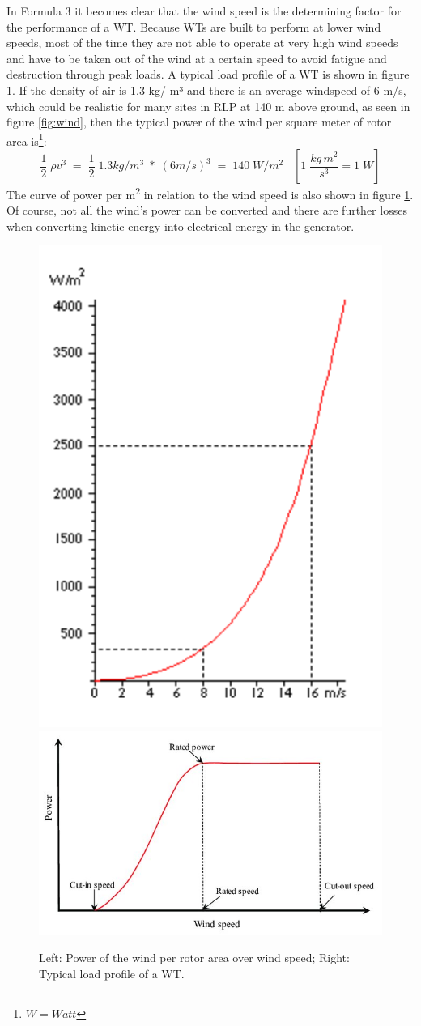 \documentclass[a4paper,11pt]{article}
\begin{document}
In Formula 3 it becomes clear that the wind speed is the determining factor for the performance of a WT. Because WTs are built to perform at lower wind speeds, most of the time they are not able to operate at very high wind speeds and have to be taken out of the wind at a certain speed to avoid fatigue and destruction through peak loads. A typical load profile of a WT is shown in figure \ref{fig:powerofwind}. If the density of air is 1.3 kg/ m³ and there is an average windspeed of 6 m/s, which could be realistic for many sites in RLP at 140 m above ground, as seen in figure \ref{fig:wind}, then the typical power of the wind per square meter of rotor area is\footnote{\(W= Watt\)}:
\begin{equation}
\frac{1}{2}\; \rho v^3\;=\;\frac{1}{2}\;1.3 kg/m^3\; *\; (6 m/s)^3\;=\;140\; W/m^2\;\;\; [1\; \frac{kg\, m^2}{s^3} = 1\; W]
\end{equation}
The curve of power per m\textsuperscript{2} in relation to the wind speed is also shown in figure \ref{fig:powerofwind}. Of course, not all the wind's power can be converted and there are further losses when converting kinetic energy into electrical energy in the generator.
\begin{figure}

{\centering \includegraphics[width=0.49\linewidth,height=0.25\textheight]{figures/power2} \includegraphics[width=0.49\linewidth,height=0.25\textheight]{figures/Typical-wind-power-output-versus-wind-speed_W640} 

}

\caption{Left: Power of the wind per rotor area over wind speed; Right: Typical load profile of a WT.}\label{fig:powerofwind}
\end{figure}
\end{document}
